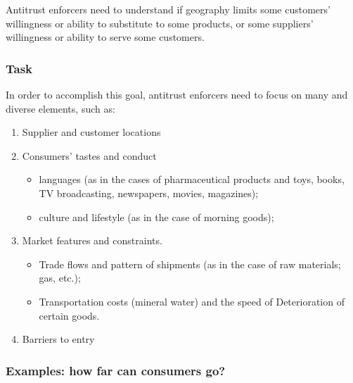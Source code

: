             Antitrust enforcers need to understand if geography limits some customers’ willingness or ability to substitute to some products, or some suppliers’ willingness or ability to serve some customers.

        \subsubsection{Task}

            In order to accomplish this goal, antitrust enforcers need to focus on many and diverse elements, such as:
            \begin{enumerate}
                \item Supplier and customer locations
                \item Consumers’ tastes and conduct
                    \begin{itemize}
                        \item languages (as in the cases of pharmaceutical products and toys, books, TV broadcasting, newspapers, movies, magazines);
                        \item culture and lifestyle (as in the case of morning goods);
                    \end{itemize}
                \item Market features and constraints.
                    \begin{itemize}
                        \item Trade flows and pattern of shipments (as in the case of raw materials; gas, etc.);
                        \item Transportation costs (mineral water) and the speed of Deterioration of certain goods.
                    \end{itemize}
                \item Barriers to entry
            \end{enumerate}

\newpage
        \subsubsection{Examples: how far can consumers go?}

